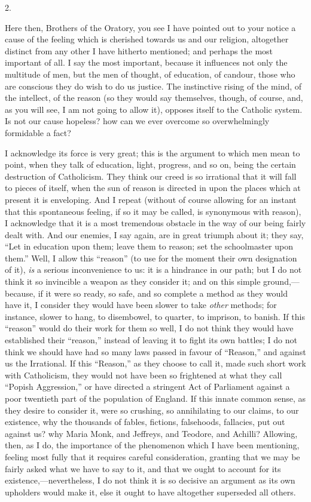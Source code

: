 2.

Here then, Brothers of the Oratory, you see I have
pointed out to your notice a cause of the feeling which
is cherished towards us and our religion, altogether
distinct from any other I have hitherto mentioned; and
perhaps the most important of all. I say the most
important, because it influences not only the multitude
of men, but the men of thought, of education, of candour,
those who are conscious they do wish to do us justice.
The instinctive rising of the mind, of the intellect, of
the reason (so they would say themselves, though, of
course, and, as you will see, I am not going to allow
it), opposes itself to the Catholic system. Is not our
cause hopeless? how can we ever overcome so
overwhelmingly formidable a fact?

I acknowledge its force is very great; this is the
argument to which men mean to point, when they talk of
education, light, progress, and so on, being the certain
destruction of Catholicism. They think our creed is so
irrational that it will fall to pieces of itself, when
the sun of reason is directed in upon the places which at
present it is enveloping. And I repeat (without of course
allowing for an instant that this spontaneous feeling, if
so it may be called, is synonymous with reason), I
acknowledge that it is a most tremendous obstacle in the
way of our being fairly dealt with. And our enemies, I
say again, are in great triumph about it; they say,
``Let in education upon them; leave them to reason;
set the schoolmaster upon them.'' Well, I allow this
``reason'' (to use for the moment their own
designation of it), \emph{is} a serious inconvenience
to us: it is a hindrance in our path; but I do not think
it so invincible a weapon as they consider it; and on
this simple ground,—because, if it were so ready, so
safe, and so complete a method as they would have it, I
consider they would have been slower to take \emph{other}
methods; for instance, slower to hang, to disembowel, to
quarter, to imprison, to banish. If this
``reason'' would do their work for them so well,
I do not think they would have established their
``reason,'' instead of leaving it to fight its
own battles; I do not think we should have had so many
laws passed in favour of ``Reason,'' and against
us the Irrational. If this ``Reason,'' as they
choose to call it, made such short work with Catholicism,
they would not have been so frightened at what they call
``Popish Aggression,'' or have directed a
stringent Act of Parliament against a poor twentieth part
of the population of England. If this innate common
sense, as they desire to consider it, were so crushing,
so annihilating to our claims, to our existence, why the
thousands of fables, fictions, falsehoods, fallacies, put
out against us? why Maria Monk, and Jeffreys, and
Teodore, and Achilli? Allowing, then, as I do, the
importance of the phenomenon which I have been
mentioning, feeling most fully that it requires careful
consideration, granting that we may be fairly asked what
we have to say to it, and that we ought to account for
its existence,—nevertheless, I do not think it is so
decisive an argument as its own upholders would make it,
else it ought to have altogether superseded all others.

